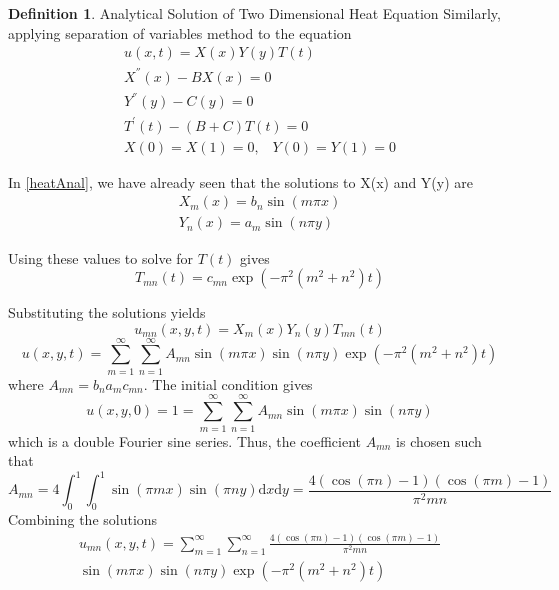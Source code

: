 \documentclass[12pt, oneside]{book}
\theoremstyle{plain}
\theoremstyle{definition}
\newtheorem{definition}[theorem]{Definition}
\begin{document}
\begin{definition}\label{heat2Anal} Analytical Solution of Two Dimensional Heat Equation
Similarly, applying separation of variables method to the equation
\begin{eqnarray}
u(x,t) = X(x) Y(y) T(t) \\[10pt]
X^{''}(x) - B X(x) = 0 \\[10pt]
Y^{''}(y) - C (y) = 0 \\[10pt]
T^{'}(t) - (B + C) T(t) = 0 \\[10pt]
X(0) = X(1) = 0, \hspace{10pt} Y(0) = Y(1) = 0
\end{eqnarray}

In \ref{heatAnal}, we have already seen that the solutions to X(x) and Y(y) are
\begin{eqnarray} 
X_m (x) =  b_n \sin(m \pi x) \\
Y_n (x) =  a_m \sin(n \pi y)
\end{eqnarray}

Using these values to solve for $T(t)$ gives
\begin{equation}
T_{mn}(t) = c_{mn} \exp(- \pi^2 (m^2 + n^2)t)
\end{equation}

Substituting the solutions yields
\begin{equation}
u_{mn}(x, y, t) = X_m(x) Y_n(y) T_{mn}(t)
\end{equation}
\begin{equation}
u(x, y, t) = \sum_{m=1}^{\infty} \sum_{n=1}^{\infty} A_{mn} \sin(m \pi x) \sin(n \pi y) \exp(- \pi^2 (m^2 + n^2)t)
\end{equation}
where $A_{mn} = b_n a_m c_{mn}$.
The initial condition gives
\begin{equation}
u(x, y, 0) = 1 = \sum_{m=1}^{\infty} \sum_{n=1}^{\infty}  A_{mn} \sin(m \pi x) \sin(n \pi y)
\end{equation}
which is a double Fourier sine series. Thus, the coefficient $A_{mn}$ is chosen such that
\begin{equation}
 A_{mn} = 4 \int_{0}^{1}  \int_{0}^{1} \sin(\pi m x) \sin(\pi n y) \mathrm{d}x \mathrm{d}y = \frac{4(\cos(\pi n) - 1)(\cos(\pi m) - 1)}{\pi^2 m n} 
\end{equation}
Combining the solutions
\begin{multline}
u_{mn}(x, y, t) =  \sum_{m=1}^{\infty} \sum_{n=1}^{\infty} \frac{4(\cos(\pi n) - 1)(\cos(\pi m) - 1)}{\pi^2 m n}  \\ \sin(m \pi x) \sin(n \pi y) \exp(- \pi^2 (m^2 + n^2)t)
\end{multline}

\end{definition}
\end{document}
